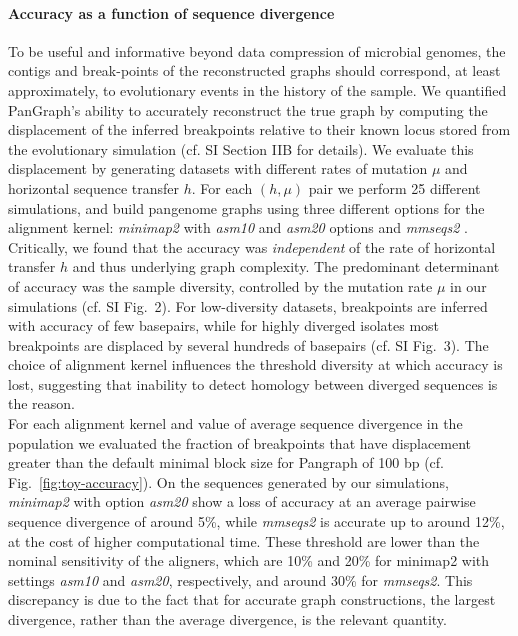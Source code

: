 \documentclass[aps,rmp,reprint,superscriptaddress,notitlepage,10pt]{revtex4-1}
\begin{document}
\paragraph*{Accuracy as a function of sequence divergence}
To be useful and informative beyond data compression of microbial genomes, the contigs and break-points of the reconstructed graphs should correspond, at least approximately, to evolutionary events in the history of the sample.
We quantified PanGraph's ability to accurately reconstruct the true graph by computing the displacement of the inferred breakpoints relative to their known locus stored from the evolutionary simulation (cf. SI Section IIB for details). We evaluate this displacement by generating datasets with different rates of mutation $\mu$ and horizontal sequence transfer $h$. For each $(h,\mu)$ pair we perform 25 different simulations, and build pangenome graphs using three different options for the alignment kernel: \textit{minimap2} \cite{li2018minimap2} with \textit{asm10} and \textit{asm20} options and \textit{mmseqs2} \cite{steinegger2017mmseqs2}.
Critically, we found that the accuracy was \emph{independent} of the rate of horizontal transfer $h$ and thus underlying graph complexity.
The predominant determinant of accuracy was the sample diversity, controlled by the mutation rate $\mu$ in our simulations (cf. SI Fig.~2). For low-diversity datasets, breakpoints are inferred with accuracy of few basepairs, while for highly diverged isolates most breakpoints are displaced by several hundreds of basepairs (cf. SI Fig.~3). The choice of alignment kernel influences the threshold diversity at which accuracy is lost, suggesting that inability to detect homology between diverged sequences is the reason.\\
For each alignment kernel and value of average sequence divergence in the population we evaluated the fraction of breakpoints that have displacement greater than the default minimal block size for Pangraph of 100 bp (cf. Fig.~\ref{fig:toy-accuracy}). On the sequences generated by our simulations, \textit{minimap2} with option \textit{asm20} show a loss of accuracy at an average pairwise sequence divergence of around 5\%, while \textit{mmseqs2} is accurate up to around 12\%, at the cost of higher computational time.
These threshold are lower than the nominal sensitivity of the aligners, which are 10\% and 20\% for minimap2 with settings \textit{asm10} and \textit{asm20}, respectively, and around 30\% for \textit{mmseqs2}.
This discrepancy is due to the fact that for accurate graph constructions, the largest divergence, rather than the average divergence, is the relevant quantity.
\end{document}
